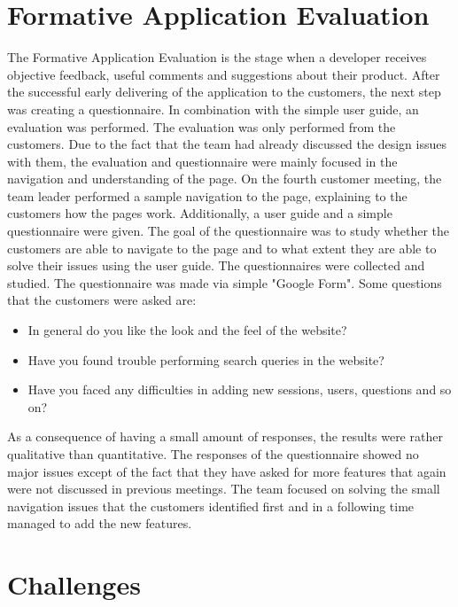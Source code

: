 \documentclass{l3proj}
\begin{document}
\section{Formative Application Evaluation}
\label{sec:appEval}

The Formative Application Evaluation is the stage when a developer receives objective feedback, useful comments and suggestions about their product.  After the successful early delivering of the application to the customers, the next step was creating a questionnaire. In combination with the simple user guide, an evaluation was performed. The evaluation was only performed from the customers. Due to the fact that the team had already discussed the design issues with them, the evaluation and questionnaire were mainly focused in the navigation and understanding of the page. On the  fourth customer meeting, the team leader performed a sample navigation to the page, explaining to the customers how the pages work.  Additionally, a user guide and a simple questionnaire were given. The goal of the questionnaire was to study whether the customers are able to navigate to the page and to what extent they are able to solve their issues using the user guide. The questionnaires were collected and studied.  The questionnaire was made via simple "Google Form". Some questions that the customers were asked are:
\begin{itemize}
 \item In general do you like the look and the feel of the website?
 \item Have you found trouble performing search queries in the website?
 \item Have you faced any difficulties in adding new sessions, users, questions and so on?
\end{itemize}

As a consequence of having a small amount of responses, the results were rather qualitative than quantitative. The responses of the questionnaire showed no major issues except of the fact that they have asked for more features that again were not discussed in previous meetings.  The team focused on solving the small navigation issues that the customers identified first and in a following time managed to add the new features.


\section{Challenges}
\label{challenges}
\end{document}
